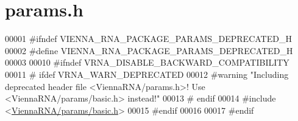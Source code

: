 \hypertarget{params_8h_source}{}\section{params.\+h}
\label{params_8h_source}

\begin{DoxyCode}
00001 \textcolor{preprocessor}{#ifndef VIENNA\_RNA\_PACKAGE\_PARAMS\_DEPRECATED\_H}
00002 \textcolor{preprocessor}{#define VIENNA\_RNA\_PACKAGE\_PARAMS\_DEPRECATED\_H}
00003 
00010 \textcolor{preprocessor}{#ifndef VRNA\_DISABLE\_BACKWARD\_COMPATIBILITY}
00011 \textcolor{preprocessor}{# ifdef VRNA\_WARN\_DEPRECATED}
00012 \textcolor{preprocessor}{#warning "Including deprecated header file <ViennaRNA/params.h>! Use <ViennaRNA/params/basic.h> instead!"}
00013 \textcolor{preprocessor}{# endif}
00014 \textcolor{preprocessor}{#include <\hyperlink{params_2basic_8h}{ViennaRNA/params/basic.h}>}
00015 \textcolor{preprocessor}{#endif}
00016 
00017 \textcolor{preprocessor}{#endif}
\end{DoxyCode}

